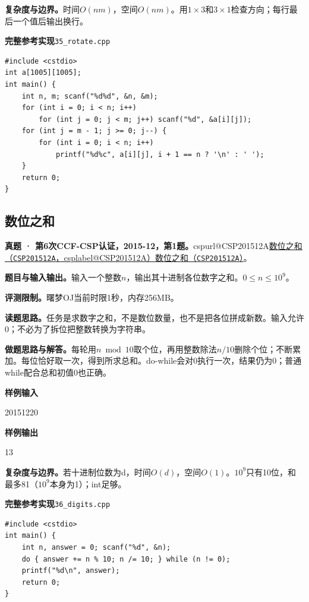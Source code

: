 \documentclass[UTF8,11pt,a4paper,fontset=none]{ctexart}
\makeatletter
\newcommand{\csp}[2]{\ifcsname cspurl@#1\endcsname\href{\csname cspurl@#1\endcsname}{#2（\texttt{#1}，\csname csplabel@#1\endcsname）}\else\href{https://oj.shumeng.tech/p/#1}{#2（\texttt{#1}）}\fi}
\makeatother
\begin{document}
\noindent\textbf{复杂度与边界。}时间$O(nm)$，空间$O(nm)$。用$1\times3$和$3\times1$检查方向；每行最后一个值后输出换行。
\par\noindent\begin{minipage}{\linewidth}
\textbf{完整参考实现}\quad\texttt{35\_rotate.cpp}
\begin{lstlisting}
#include <cstdio>
int a[1005][1005];
int main() {
    int n, m; scanf("%d%d", &n, &m);
    for (int i = 0; i < n; i++)
        for (int j = 0; j < m; j++) scanf("%d", &a[i][j]);
    for (int j = m - 1; j >= 0; j--) {
        for (int i = 0; i < n; i++)
            printf("%d%c", a[i][j], i + 1 == n ? '\n' : ' ');
    }
    return 0;
}
\end{lstlisting}
\end{minipage}\par

\subsection{数位之和}
\textbf{真题 · 第6次CCF-CSP认证，2015-12，第1题。}\csp{CSP201512A}{数位之和}。

\noindent\textbf{题目与输入输出。}输入一个整数$n$，输出其十进制各位数字之和。$0\le n\le10^9$。

\noindent\textbf{评测限制。}曙梦OJ当前时限1秒，内存256MB。

\noindent\textbf{读题思路。}任务是求数字之和，不是数位数量，也不是把各位拼成新数。输入允许0；不必为了拆位把整数转换为字符串。

\noindent\textbf{做题思路与解答。}每轮用$n\bmod10$取个位，再用整数除法$n/10$删除个位；不断累加。每位恰好取一次，得到所求总和。do-while会对0执行一次，结果仍为0；普通while配合总和初值0也正确。
\begin{tcolorbox}[samplebox,title={输入输出样例}]
\textbf{样例输入}
\begin{Sample}
20151220
\end{Sample}
\tcblower
\textbf{样例输出}
\begin{Sample}
13
\end{Sample}
\end{tcolorbox}

\noindent\textbf{复杂度与边界。}若十进制位数为d，时间$O(d)$，空间$O(1)$。$10^9$只有10位，和最多81（$10^9$本身为1）；int足够。
\par\noindent\begin{minipage}{\linewidth}
\textbf{完整参考实现}\quad\texttt{36\_digits.cpp}
\begin{lstlisting}
#include <cstdio>
int main() {
    int n, answer = 0; scanf("%d", &n);
    do { answer += n % 10; n /= 10; } while (n != 0);
    printf("%d\n", answer);
    return 0;
}
\end{lstlisting}
\end{minipage}\par
\end{document}

